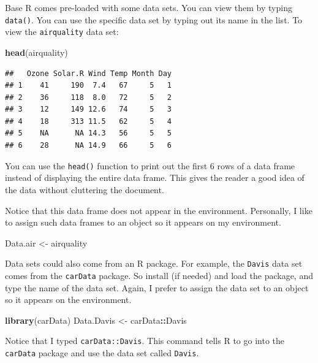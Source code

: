 \documentclass[
]{book}
\newenvironment{Shaded}{\begin{snugshade}}{\end{snugshade}}
\newcommand{\FunctionTok}[1]{\textcolor[rgb]{0.13,0.29,0.53}{\textbf{#1}}}
\newcommand{\NormalTok}[1]{#1}
\newcommand{\OtherTok}[1]{\textcolor[rgb]{0.56,0.35,0.01}{#1}}
\newcommand{\SpecialCharTok}[1]{\textcolor[rgb]{0.81,0.36,0.00}{\textbf{#1}}}
\theoremstyle{definition}
\theoremstyle{definition}
\theoremstyle{definition}
\theoremstyle{definition}
\theoremstyle{remark}
\begin{document}
Base R comes pre-loaded with some data sets. You can view them by typing \texttt{data()}. You can use the specific data set by typing out its name in the list. To view the \texttt{airquality} data set:

\begin{Shaded}
\begin{Highlighting}[]
\FunctionTok{head}\NormalTok{(airquality)}
\end{Highlighting}
\end{Shaded}

\begin{verbatim}
##   Ozone Solar.R Wind Temp Month Day
## 1    41     190  7.4   67     5   1
## 2    36     118  8.0   72     5   2
## 3    12     149 12.6   74     5   3
## 4    18     313 11.5   62     5   4
## 5    NA      NA 14.3   56     5   5
## 6    28      NA 14.9   66     5   6
\end{verbatim}

You can use the \texttt{head()} function to print out the first 6 rows of a data frame instead of displaying the entire data frame. This gives the reader a good idea of the data without cluttering the document.

Notice that this data frame does not appear in the environment. Personally, I like to assign such data frames to an object so it appears on my environment.

\begin{Shaded}
\begin{Highlighting}[]
\NormalTok{Data.air }\OtherTok{\textless{}{-}}\NormalTok{ airquality}
\end{Highlighting}
\end{Shaded}

Data sets could also come from an R package. For example, the \texttt{Davis} data set comes from the \texttt{carData} package. So install (if needed) and load the package, and type the name of the data set. Again, I prefer to assign the data set to an object so it appears on the environment.

\begin{Shaded}
\begin{Highlighting}[]
\FunctionTok{library}\NormalTok{(carData)}
\NormalTok{Data.Davis }\OtherTok{\textless{}{-}}\NormalTok{ carData}\SpecialCharTok{::}\NormalTok{Davis}
\end{Highlighting}
\end{Shaded}

Notice that I typed \texttt{carData::Davis}. This command tells R to go into the \texttt{carData} package and use the data set called \texttt{Davis}.
\end{document}
